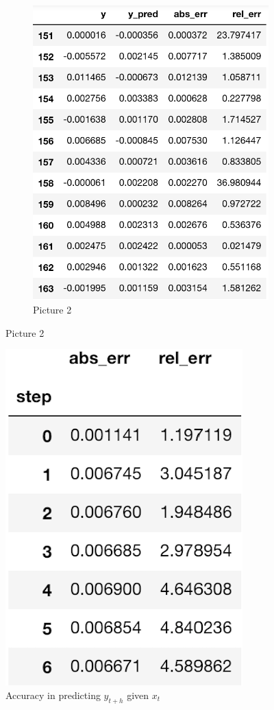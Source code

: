 \documentclass{article}%
\begin{document}
\begin{figure}
\begin{subfigure}[b]{0.6\textwidth}
    \includegraphics[width=\textwidth]{pred_step1.png}
    \caption{Picture 2}
    \label{fig:2}
  \end{subfigure}
\end{figure}
\fi

\begin{figure}[h!]
  \centering
  \includegraphics[scale=0.55]{err_step.png}
  \caption{Accuracy in predicting $y_{t+h}$ given $x_t$ }
  \label{err_step}
\end{figure}
\end{document}
